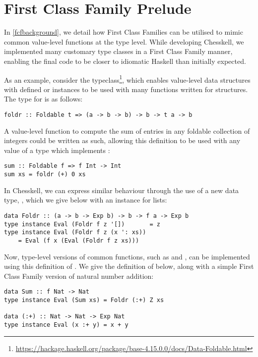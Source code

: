 \section{First Class Family Prelude}

In \cref{fcfbackground}, we detail how First Class Families can be utilised to mimic common value-level functions at the type level. While developing Chesskell, we implemented many customary type classes in a First Class Family manner, enabling the final code to be closer to idiomatic Haskell than initially expected.

As an example, consider the  typeclass\footnote{\url{https://hackage.haskell.org/package/base-4.15.0.0/docs/Data-Foldable.html}}, which enables value-level data structures with defined  or  instances to be used with many functions written for  structures. The type for  is as follows:

\begin{lstlisting}
foldr :: Foldable t => (a -> b -> b) -> b -> t a -> b
\end{lstlisting}

A value-level function to compute the sum of entries in any foldable collection of integers could be written as such, allowing this definition to be used with any value of a type which implements :

\begin{lstlisting}
sum :: Foldable f => f Int -> Int
sum xs = foldr (+) 0 xs
\end{lstlisting}

In Chesskell, we can express similar behaviour through the use of a new data type, , which we give below with an  instance for lists:

\begin{lstlisting}
data Foldr :: (a -> b -> Exp b) -> b -> f a -> Exp b
type instance Eval (Foldr f z '[])       = z
type instance Eval (Foldr f z (x ': xs))
    = Eval (f x (Eval (Foldr f z xs)))
\end{lstlisting}

Now, type-level versions of common  functions, such as  and , can be implemented using this definition of . We give the definition of  below, along with a simple First Class Family version of natural number addition:

\begin{lstlisting}
data Sum :: f Nat -> Nat
type instance Eval (Sum xs) = Foldr (:+) Z xs

data (:+) :: Nat -> Nat -> Exp Nat
type instance Eval (x :+ y) = x + y
\end{lstlisting}

